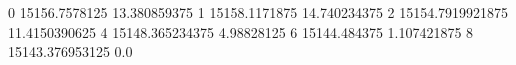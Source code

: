 0 15156.7578125 13.380859375
1 15158.1171875 14.740234375
2 15154.7919921875 11.4150390625
4 15148.365234375 4.98828125
6 15144.484375 1.107421875
8 15143.376953125 0.0
